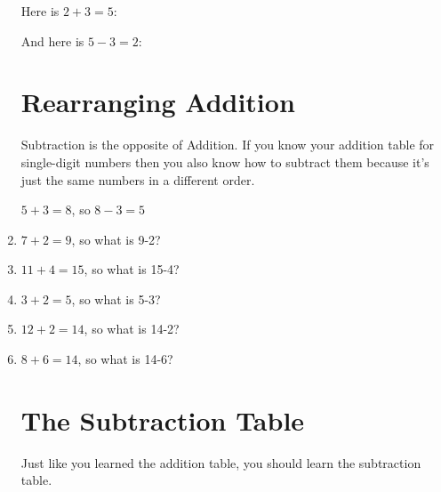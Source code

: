 \documentclass[12pt]{article}
\begin{document}
\begin{enumerate}
Here is $2+3=5$:

\begin{center}
\end{center}

And here is $5-3=2$:

\begin{center}
\end{center}

\section*{Rearranging Addition}
Subtraction is the opposite of Addition. If you know your addition table for single-digit numbers then you also know how to subtract them because it's just the same numbers in a different order.

\begin{center}
$5 + 3 = 8$, so $8 - 3 = 5$
\end{center}

\item $7+2=9$, so what is 9-2?
\item $11+4=15$, so what is 15-4?
\item $3+2=5$, so what is 5-3?
\item $12+2=14$, so what is 14-2?
\item $8+6=14$, so what is 14-6?

\section*{The Subtraction Table}
Just like you learned the addition table, you should learn the subtraction table.


\end{enumerate}
\end{document}
